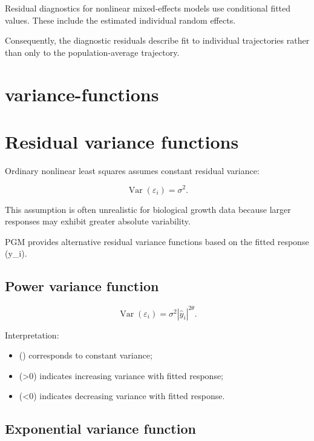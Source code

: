 \documentclass[
  english,
  letterpaper,
  DIV=11,
  numbers=noendperiod]{scrreprt}
\providecommand{\tightlist}{%
  \setlength{\itemsep}{0pt}\setlength{\parskip}{0pt}}
\begin{document}
Residual diagnostics for nonlinear mixed-effects models use conditional
fitted values. These include the estimated individual random effects.

Consequently, the diagnostic residuals describe fit to individual
trajectories rather than only to the population-average trajectory.

\chapter{variance-functions}\label{variance-functions}

\chapter{Residual variance functions}\label{residual-variance-functions}

Ordinary nonlinear least squares assumes constant residual variance:

\[
\operatorname{Var}(\varepsilon_i)=\sigma^2.
\]

This assumption is often unrealistic for biological growth data because
larger responses may exhibit greater absolute variability.

PGM provides alternative residual variance functions based on the fitted
response (\hat y\_i).

\section{Power variance function}\label{power-variance-function}

\[
\operatorname{Var}(\varepsilon_i)
=
\sigma^2 |\hat y_i|^{2\theta}.
\]

Interpretation:

\begin{itemize}
\tightlist
\item
  () corresponds to constant variance;
\item
  (\theta\textgreater0) indicates increasing variance with fitted
  response;
\item
  (\theta\textless0) indicates decreasing variance with fitted response.
\end{itemize}

\section{Exponential variance
function}\label{exponential-variance-function}
\end{document}
